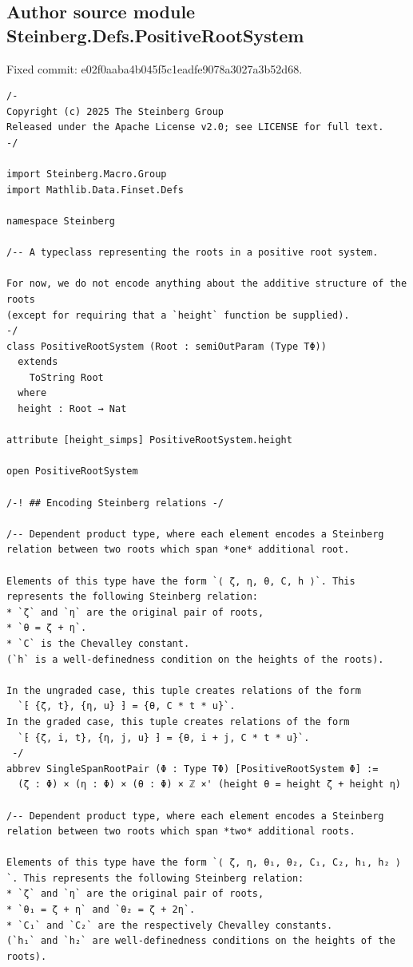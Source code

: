 \subsection*{Author source module Steinberg.Defs.PositiveRootSystem}
\noindent Fixed commit: e02f0aaba4b045f5c1eadfe9078a3027a3b52d68.
\begin{Verbatim}
/-
Copyright (c) 2025 The Steinberg Group
Released under the Apache License v2.0; see LICENSE for full text.
-/

import Steinberg.Macro.Group
import Mathlib.Data.Finset.Defs

namespace Steinberg

/-- A typeclass representing the roots in a positive root system.

For now, we do not encode anything about the additive structure of the roots
(except for requiring that a `height` function be supplied).
-/
class PositiveRootSystem (Root : semiOutParam (Type TΦ))
  extends
    ToString Root
  where
  height : Root → Nat

attribute [height_simps] PositiveRootSystem.height

open PositiveRootSystem

/-! ## Encoding Steinberg relations -/

/-- Dependent product type, where each element encodes a Steinberg relation between two roots which span *one* additional root.

Elements of this type have the form `⟨ ζ, η, θ, C, h ⟩`. This represents the following Steinberg relation:
* `ζ` and `η` are the original pair of roots,
* `θ = ζ + η`.
* `C` is the Chevalley constant.
(`h` is a well-definedness condition on the heights of the roots).

In the ungraded case, this tuple creates relations of the form
  `⁅ {ζ, t}, {η, u} ⁆ = {θ, C * t * u}`.
In the graded case, this tuple creates relations of the form
  `⁅ {ζ, i, t}, {η, j, u} ⁆ = {θ, i + j, C * t * u}`.
 -/
abbrev SingleSpanRootPair (Φ : Type TΦ) [PositiveRootSystem Φ] :=
  (ζ : Φ) × (η : Φ) × (θ : Φ) × ℤ ×' (height θ = height ζ + height η)

/-- Dependent product type, where each element encodes a Steinberg relation between two roots which span *two* additional roots.

Elements of this type have the form `⟨ ζ, η, θ₁, θ₂, C₁, C₂, h₁, h₂ ⟩`. This represents the following Steinberg relation:
* `ζ` and `η` are the original pair of roots,
* `θ₁ = ζ + η` and `θ₂ = ζ + 2η`.
* `C₁` and `C₂` are the respectively Chevalley constants.
(`h₁` and `h₂` are well-definedness conditions on the heights of the roots).


\end{Verbatim}
